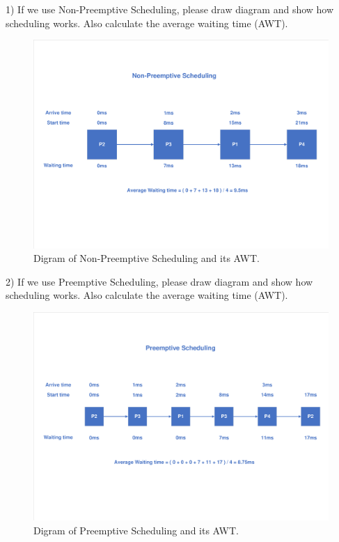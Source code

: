 \documentclass[a4paper]{article}
\begin{document}
1) If we use Non-Preemptive Scheduling, please draw diagram and show how scheduling works. Also calculate the average waiting time (AWT).
\begin{figure}[H]
    \centering
    \includegraphics[width=1\textwidth]{5-1.pdf}
    \caption{Digram of Non-Preemptive Scheduling and its AWT.}
\end{figure}
2) If we use Preemptive Scheduling, please draw diagram and show how scheduling works. Also calculate the average waiting time (AWT).
\begin{figure}[H]
    \centering
    \includegraphics[width=1\textwidth]{5-2.pdf}
    \caption{Digram of Preemptive Scheduling and its AWT.}
\end{figure}
\end{document}
